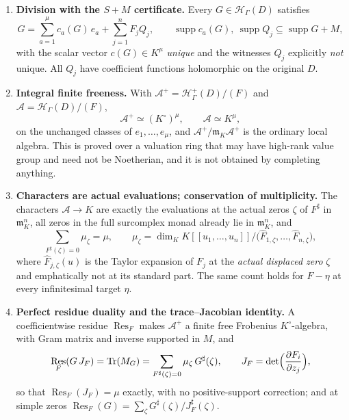 \documentclass[11pt,letterpaper]{article}
\theoremstyle{definition}
\theoremstyle{remark}
\newcommand{\HH}{\mathscr H}
\newcommand{\Hp}{\mathscr H^{+}}
\newcommand{\Alg}{\mathcal A}
\newcommand{\mm}{\mathfrak m}
\newcommand{\Kc}{K^{\circ}}
\newcommand{\sh}{^{\sharp}}
\DeclareMathOperator{\supp}{supp}
\DeclareMathOperator{\Res}{Res}
\DeclareMathOperator{\Tr}{Tr}
\numberwithin{equation}{section}
\begin{document}
\begin{enumerate}
\item \textbf{Division with the $S+M$ certificate.} Every $G\in\HH_\Gamma(D)$ satisfies
\begin{equation}\label{finite:eq:introdivision}
 G=\sum_{a=1}^{\mu}c_a(G)\,e_a+\sum_{j=1}^{n}F_jQ_j,
 \qquad
 \supp c_a(G),\ \supp Q_j\subseteq\supp G+M,
\end{equation}
with the scalar vector $c(G)\in K^\mu$ \emph{unique} and the witnesses $Q_j$ explicitly \emph{not} unique. All $Q_j$ have coefficient functions holomorphic on the original $D$.
\item \textbf{Integral finite freeness.} With $\Alg^+=\Hp_\Gamma(D)/(F)$ and $\Alg=\HH_\Gamma(D)/(F)$,
\begin{equation}\label{finite:eq:introfree}
 \Alg^+\simeq(\Kc)^\mu,\qquad \Alg\simeq K^\mu,
\end{equation}
on the unchanged classes of $e_1,\ldots,e_\mu$, and $\Alg^+/\mm_K\Alg^+$ is the ordinary local algebra. This is proved over a valuation ring that may have high-rank value group and need not be Noetherian, and it is not obtained by completing anything.
\item \textbf{Characters are actual evaluations; conservation of multiplicity.} The characters $\Alg\to K$ are exactly the evaluations at the actual zeros $\zeta$ of $F\sh$ in $\mm_K^n$, all zeros in the full surcomplex monad already lie in $\mm_K^n$, and
\begin{equation}\label{finite:eq:introlength}
 \sum_{F\sh(\zeta)=0}\mu_\zeta=\mu,
 \qquad
 \mu_\zeta=\dim_K K[[u_1,\ldots,u_n]]\big/
 \bigl(\widehat F_{1,\zeta},\ldots,\widehat F_{n,\zeta}\bigr),
\end{equation}
where $\widehat F_{j,\zeta}(u)$ is the Taylor expansion of $F_j$ at the \emph{actual displaced zero} $\zeta$ and emphatically not at its standard part. The same count holds for $F-\eta$ at every infinitesimal target $\eta$.
\item \textbf{Perfect residue duality and the trace--Jacobian identity.} A coefficientwise residue $\Res_F$ makes $\Alg^+$ a finite free Frobenius $\Kc$-algebra, with Gram matrix and inverse supported in $M$, and
\begin{equation}\label{finite:eq:introtrace}
 \Res_F(G\,J_F)=\Tr(M_G)=\sum_{F\sh(\zeta)=0}\mu_\zeta\,G\sh(\zeta),
 \qquad
 J_F=\det\Bigl(\frac{\partial F_i}{\partial z_j}\Bigr),
\end{equation}
so that $\Res_F(J_F)=\mu$ exactly, with no positive-support correction; and at simple zeros $\Res_F(G)=\sum_\zeta G\sh(\zeta)/J_F\sh(\zeta)$.
\end{enumerate}
\end{document}
